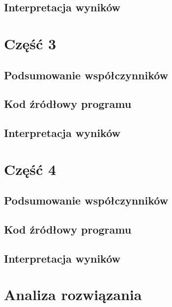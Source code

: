 \documentclass[
	12pt, %
]{fphw}
\begin{document}
\subsection{Interpretacja wyników}
\section{Część 3}
\subsection{Podsumowanie współczynników}
\subsection{Kod źródłowy programu}
\subsection{Interpretacja wyników}
\section{Część 4}
\subsection{Podsumowanie współczynników}
\subsection{Kod źródłowy programu}
\subsection{Interpretacja wyników}
\section{Analiza rozwiązania}
\end{document}
